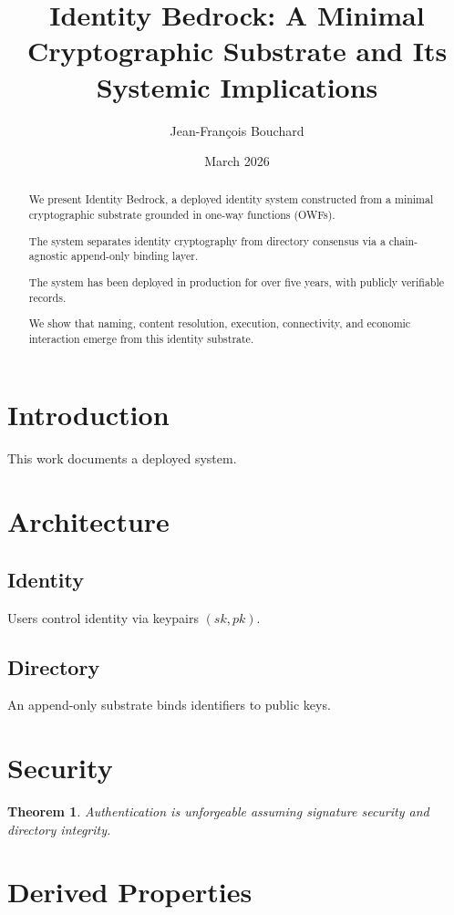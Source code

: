 \documentclass[11pt,a4paper]{article}
\title{\textbf{Identity Bedrock: A Minimal Cryptographic Substrate and Its Systemic Implications}}
\author{Jean-François Bouchard}
\date{March 2026}
\newtheorem{theorem}{Theorem}[section]
\begin{document}
\maketitle

\begin{abstract}
We present Identity Bedrock, a deployed identity system constructed from a minimal cryptographic substrate grounded in one-way functions (OWFs).

The system separates identity cryptography from directory consensus via a chain-agnostic append-only binding layer.

The system has been deployed in production for over five years, with publicly verifiable records.

We show that naming, content resolution, execution, connectivity, and economic interaction emerge from this identity substrate.
\end{abstract}

\section{Introduction}

This work documents a deployed system.

\section{Architecture}

\subsection{Identity}

Users control identity via keypairs $(sk, pk)$.

\subsection{Directory}

An append-only substrate binds identifiers to public keys.

\section{Security}

\begin{theorem}
Authentication is unforgeable assuming signature security and directory integrity.
\end{theorem}

\section{Derived Properties}
\end{document}
